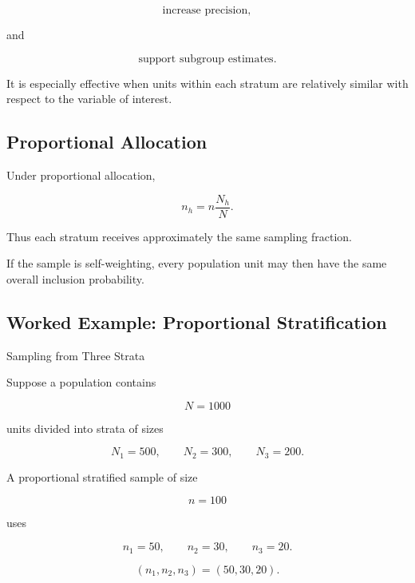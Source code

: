 \[
\boxed{
\text{increase precision},
}
\]

and

\[
\boxed{
\text{support subgroup estimates}.
}
\]

It is especially effective when units within each stratum are relatively
similar with respect to the variable of interest.

\subsection{Proportional Allocation}
\label{subsec:proportional-allocation}

Under proportional allocation,

\[
\boxed{
n_h
=
n
\frac{N_h}{N}.
}
\]

Thus each stratum receives approximately the same sampling fraction.

If the sample is self-weighting, every population unit may then have the
same overall inclusion probability.

\subsection{Worked Example: Proportional Stratification}
\label{subsec:worked-proportional-stratification}

\begin{workedexamplebox}{Sampling from Three Strata}

Suppose a population contains

\[
N=1000
\]

units divided into strata of sizes

\[
N_1=500,
\qquad
N_2=300,
\qquad
N_3=200.
\]

A proportional stratified sample of size

\[
n=100
\]

uses

\[
n_1=50,
\qquad
n_2=30,
\qquad
n_3=20.
\]

\begin{answerbox}
\[
\boxed{
(n_1,n_2,n_3)
=
(50,30,20).
}
\]
\end{answerbox}

\end{workedexamplebox}

